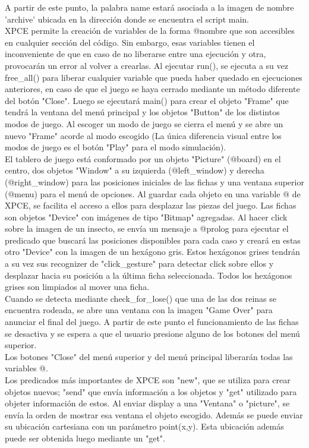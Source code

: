\documentclass[a4paper,12pt]{article}
\begin{document}
A partir de este punto, la palabra name estará asociada a la imagen de nombre 'archive' ubicada en la dirección donde se encuentra el script main.\\
XPCE permite la creación de variables de la forma @nombre que son accesibles en cualquier sección del código. Sin embargo, esas variables tienen el inconveniente de que en caso de no liberarse entre una ejecución y otra, provocarán un error al volver a crearlas. Al ejecutar run(), se ejecuta a su vez free\_all() para liberar cualquier variable que pueda haber quedado en ejecuciones anteriores, en caso de que el juego se haya cerrado mediante un método diferente del botón "Close". Luego se ejecutará main() para crear el objeto "Frame" que tendrá la ventana del menú principal y los objetos "Button" de los distintos modos de juego. Al escoger un modo de juego se cierra el menú y se abre un nuevo "Frame" acorde al modo escogido (La única diferencia visual entre los modos de juego es el botón "Play" para el modo simulación).\\
El tablero de juego está conformado por un objeto "Picture" (@board) en el centro, dos objetos "Window" a su izquierda (@left\_window) y derecha (@right\_window) para las posiciones iniciales de las fichas y una ventana superior (@menu) para el menú de opciones. Al guardar cada objeto en una variable @ de XPCE, se facilita el acceso a ellos para desplazar las piezas del juego. Las fichas son objetos "Device" con imágenes de tipo "Bitmap" agregadas. Al hacer click sobre la imagen de un insecto, se envía un mensaje a @prolog para ejecutar el predicado que buscará las posiciones disponibles para cada caso y creará en estas otro "Device" con la imagen de un hexágono gris. Estos hexágonos grises tendrán a su vez sus recognizer de "click\_gesture" para detectar click sobre ellos y desplazar hacia su posición a la última ficha seleccionada. Todos los hexágonos grises son limpiados al mover una ficha.\\
Cuando se detecta mediante check\_for\_lose() que una de las dos reinas se encuentra rodeada, se abre una ventana con la imagen "Game Over" para anunciar el final del juego. A partir de este punto el funcionamiento de las fichas se desactiva y se espera a que el usuario presione alguno de los botones del menú superior.\\
Los botones "Close" del menú superior y del menú principal liberarán todas las variables @.\\
Los predicados más importantes de XPCE son "new", que se utiliza para crear objetos nuevos; "send" que envía información a los objetos y "get" utilizado para objeter información de estos. Al enviar display a una "Ventana" o "picture", se envía la orden de mostrar esa ventana el objeto escogido. Además se puede enviar su ubicación cartesiana con un parámetro point(x,y). Esta ubicación además puede ser obtenida luego mediante un "get".\\
\end{document}
